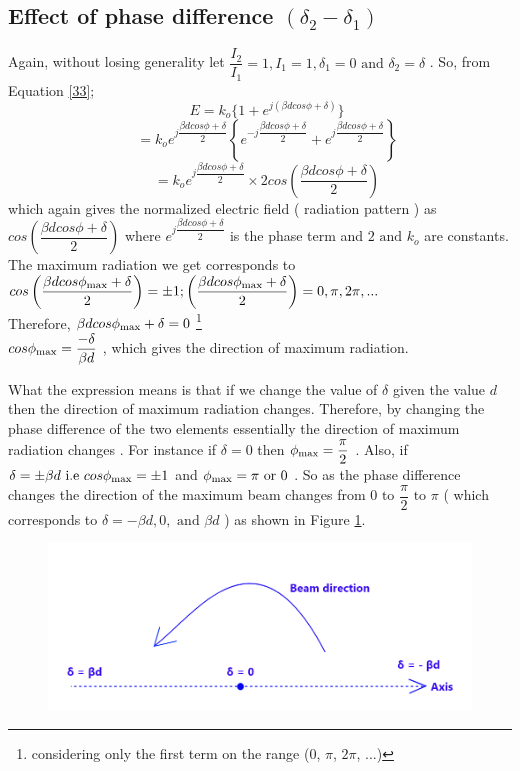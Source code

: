 \subsection{Effect of phase difference $ ( \delta_2 - \delta_1 ) $ }
Again, without losing generality let $ \dfrac{ I_2 }{ I_1 } = 1, I_1 = 1, \delta_1 = 0 \text{ and } \delta_2 = \delta $ . So, from Equation \ref{33};
$$
\quad E = k_o \{ 1 + e^{j ( \beta dcos\phi + \delta)} \}
$$
$$
\quad = k_o e^{j \dfrac{ \beta dcos\phi + \delta }{ 2 } } \left\{ e^{ -j \dfrac{ \beta dcos\phi + \delta }{ 2 } } + e^{j \dfrac{ \beta dcos\phi + \delta }{ 2 } } \right\}
$$
\begin{equation}
\quad = k_o e^{j \dfrac{ \beta dcos\phi + \delta }{ 2 } } \times 2 cos \left( \dfrac{ \beta dcos\phi + \delta }{ 2 } \right) 
\end{equation}
which again gives the normalized electric field ( radiation pattern ) as $ cos \left( \dfrac{ \beta dcos\phi + \delta }{ 2 } \right) $ where $  e^{j \dfrac{ \beta dcos\phi + \delta }{ 2 } } $ is the phase term and $ 2 \text{ and } k_o $ are constants. The maximum radiation we get corresponds to $  cos \left( \dfrac{ \beta dcos\phi_ {\textnormal{max}} + \delta }{ 2 } \right) = \pm 1 ;   \left( \dfrac{ \beta dcos\phi_ {\textnormal{max}} + \delta }{ 2 } \right) = 0, \pi, 2 \pi,... $ \\ Therefore, $\beta dcos\phi_ {\textnormal{max}} + \delta = 0 $ \footnote{considering only the first term on the range (0, $\pi$, $2\pi$, ...)}\\
$ cos\phi_ {\textnormal{max}} = \dfrac{ - \delta }{ \beta d } $ , which gives the direction of maximum radiation. 

What the expression means is that if we change the value of $\delta $ given the value $d $ then the direction of maximum radiation changes. Therefore, by changing the phase difference of the two elements essentially the direction of maximum radiation changes . For instance if $ \delta = 0 $ then $ \phi_{\textnormal{max}} = \dfrac{ \pi }{ 2 } $ . Also, if $ \delta = \pm \beta d \text{ i.e } cos\phi_{\textnormal{max}} = \pm 1 $ and $ \phi_{\textnormal{max}} = \pi \text{ or } 0 $ . So as the phase difference changes the direction of the maximum beam changes from $ 0 \text{ to } \dfrac{ \pi }{ 2 } \text{ to } \pi $ ( which corresponds to $ \delta = - \beta d , 0 , \text{ and } \beta d $ ) as shown in Figure \ref{52.4}.
\begin{figure}[h]
\centering
\includegraphics[width=1\linewidth]{./graphics/fig52_4}
\caption{}
\label{52.4}
\end{figure}


